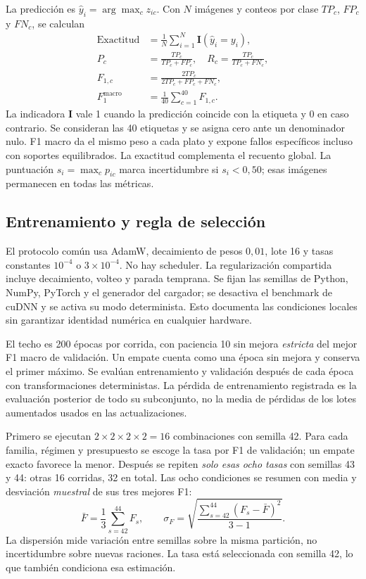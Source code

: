 \documentclass[conference]{IEEEtran}
\begin{document}
La predicción es $\hat y_i=\arg\max_c z_{ic}$. Con $N$ imágenes y conteos por clase $TP_c$, $FP_c$ y $FN_c$, se calculan
\begin{align}
\mathrm{Exactitud}&=\frac{1}{N}\sum_{i=1}^{N}\mathbf{I}(\hat y_i=y_i),\\
P_c&=\frac{TP_c}{TP_c+FP_c},\quad R_c=\frac{TP_c}{TP_c+FN_c},\\
F_{1,c}&=\frac{2TP_c}{2TP_c+FP_c+FN_c},\\
F_1^{\mathrm{macro}}&=\frac{1}{40}\sum_{c=1}^{40}F_{1,c}.
\end{align}
La indicadora $\mathbf{I}$ vale 1 cuando la predicción coincide con la etiqueta y 0 en caso contrario. Se consideran las 40 etiquetas y se asigna cero ante un denominador nulo. F1 macro da el mismo peso a cada plato y expone fallos específicos incluso con soportes equilibrados. La exactitud complementa el recuento global. La puntuación $s_i=\max_c p_{ic}$ marca incertidumbre si $s_i<0{,}50$; esas imágenes permanecen en todas las métricas.

\subsection{Entrenamiento y regla de selección}
El protocolo común usa AdamW, decaimiento de pesos $0{,}01$, lote 16 y tasas constantes $10^{-4}$ o $3\times10^{-4}$. No hay scheduler. La regularización compartida incluye decaimiento, volteo y parada temprana. Se fijan las semillas de Python, NumPy, PyTorch y el generador del cargador; se desactiva el benchmark de cuDNN y se activa su modo determinista. Esto documenta las condiciones locales sin garantizar identidad numérica en cualquier hardware.

El techo es 200 épocas por corrida, con paciencia 10 sin mejora \emph{estricta} del mejor F1 macro de validación. Un empate cuenta como una época sin mejora y conserva el primer máximo. Se evalúan entrenamiento y validación después de cada época con transformaciones deterministas. La pérdida de entrenamiento registrada es la evaluación posterior de todo su subconjunto, no la media de pérdidas de los lotes aumentados usados en las actualizaciones.

Primero se ejecutan $2\times2\times2\times2=16$ combinaciones con semilla 42. Para cada familia, régimen y presupuesto se escoge la tasa por F1 de validación; un empate exacto favorece la menor. Después se repiten \emph{solo esas ocho tasas} con semillas 43 y 44: otras 16 corridas, 32 en total. Las ocho condiciones se resumen con media y desviación \emph{muestral} de sus tres mejores F1:
\begin{equation}
\bar F=\frac{1}{3}\sum_{s=42}^{44}F_s,\qquad
\sigma_F=\sqrt{\frac{\sum_{s=42}^{44}(F_s-\bar F)^2}{3-1}}.
\end{equation}
La dispersión mide variación entre semillas sobre la misma partición, no incertidumbre sobre nuevas raciones. La tasa está seleccionada con semilla 42, lo que también condiciona esa estimación.
\end{document}
